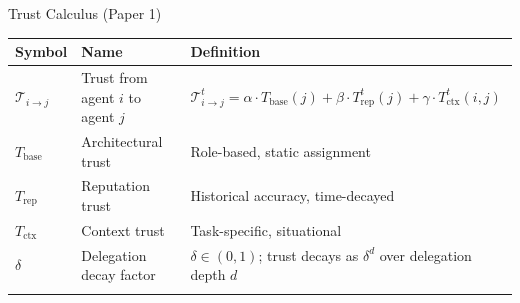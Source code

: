 \documentclass[
  ignorenonframetext,
]{beamer}
\newcounter{none} %
\begin{document}
\begin{frame}[allowframebreaks]{Trust Calculus (Paper 1)}
\protect{}\label{trust-calculus-paper-1}
{\def\LTcaptype{none} %
\begin{longtable}[]{@{}
  >{\raggedright\arraybackslash}p{}
  >{\raggedright\arraybackslash}p{}
  >{\raggedright\arraybackslash}p{}@{}}
\toprule\noalign{}
\begin{minipage}[b]{\linewidth}\raggedright
Symbol
\end{minipage} & \begin{minipage}[b]{\linewidth}\raggedright
Name
\end{minipage} & \begin{minipage}[b]{\linewidth}\raggedright
Definition
\end{minipage} \\
\midrule\noalign{}
\endhead
\(\mathcal{T}_{i \to j}\) & Trust from agent \(i\) to agent \(j\) &
\(\mathcal{T}_{i \to j}^t = \alpha \cdot T_{\text{base}}(j) + \beta \cdot T_{\text{rep}}^t(j) + \gamma \cdot T_{\text{ctx}}^t(i,j)\) \\
\(T_{\text{base}}\) & Architectural trust & Role-based, static
assignment \\
\(T_{\text{rep}}\) & Reputation trust & Historical accuracy,
time-decayed \\
\(T_{\text{ctx}}\) & Context trust & Task-specific, situational \\
\(\delta\) & Delegation decay factor & \(\delta \in (0,1)\); trust
decays as \(\delta^d\) over delegation depth \(d\) \\
\bottomrule\noalign{}
\end{longtable}
}
\end{frame}
\end{document}

